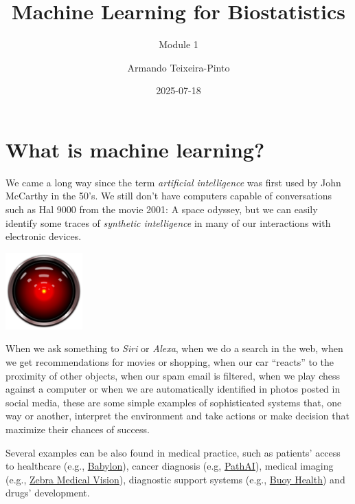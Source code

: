 \documentclass[
]{book}
\title{Machine Learning for Biostatistics}
\subtitle{Module 1}
\author{Armando Teixeira-Pinto}
\date{2025-07-18}
\begin{document}
\maketitle

{
\setcounter{tocdepth}{1}
\tableofcontents
}
\chapter*{What is machine learning?}\label{what-is-machine-learning}

We came a long way since the term \emph{artificial intelligence} was first used by
John McCarthy in the 50's. We still don't have computers capable of conversations
such as Hal 9000 from the movie 2001: A space odyssey, but we can easily
identify some traces of \emph{synthetic intelligence} in many of our interactions
with electronic devices.

\begin{center}\includegraphics[width=0.2\linewidth]{hal} \end{center}

When we ask something to \emph{Siri} or \emph{Alexa}, when we do a
search in the web, when we get recommendations for
movies or shopping, when our car ``reacts'' to the proximity of other objects,
when our spam email is filtered,
when we play chess against a computer or when we are automatically
identified in photos posted in social media, these are some simple examples of
sophisticated systems that, one way or another, interpret the environment and
take actions or make decision that maximize their chances of success.

Several examples can be also found in medical practice, such as patients'
access to healthcare (e.g., \href{https://search.proquest.com/openview/bf25c0b78beeffec5b3419ea7ffc79f9/1?pq-origsite=gscholar&cbl=2042228}{Babylon}), cancer diagnosis (e.g, \href{https://jamanetwork.com/journals/jama/article-abstract/2665774}{PathAI}),
medical imaging (e.g., \href{https://www.hbs.edu/faculty/Pages/item.aspx?num=55060}{Zebra Medical Vision}), diagnostic
support systems
(e.g., \href{https://www.bizjournals.com/boston/news/2018/08/22/boston-childrens-website-to-feature-self.html}{Buoy Health}) and drugs' development.
\end{document}
